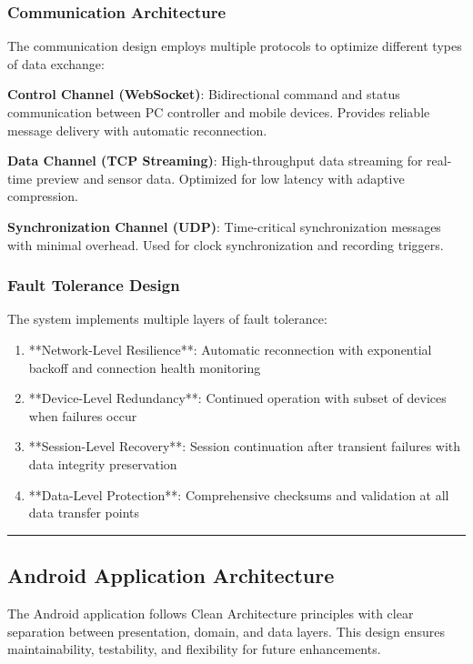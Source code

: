\documentclass[11pt,a4paper]{report}
\begin{document}
\subsubsection{Communication Architecture}

The communication design employs multiple protocols to optimize different types of data exchange:

\textbf{Control Channel (WebSocket)}: Bidirectional command and status communication between PC controller and mobile devices. Provides reliable message delivery with automatic reconnection.

\textbf{Data Channel (TCP Streaming)}: High-throughput data streaming for real-time preview and sensor data. Optimized for low latency with adaptive compression.

\textbf{Synchronization Channel (UDP)}: Time-critical synchronization messages with minimal overhead. Used for clock synchronization and recording triggers.

\subsubsection{Fault Tolerance Design}

The system implements multiple layers of fault tolerance:

\begin{enumerate}
\item **Network-Level Resilience**: Automatic reconnection with exponential backoff and connection health monitoring
\item **Device-Level Redundancy**: Continued operation with subset of devices when failures occur
\item **Session-Level Recovery**: Session continuation after transient failures with data integrity preservation
\item **Data-Level Protection**: Comprehensive checksums and validation at all data transfer points

\end{enumerate}
\hrule

\subsection{Android Application Architecture}

The Android application follows Clean Architecture principles with clear separation between presentation, domain, and data layers. This design ensures maintainability, testability, and flexibility for future enhancements.
\end{document}
